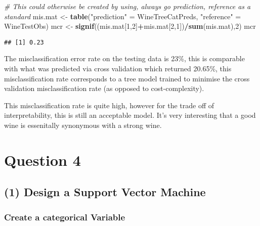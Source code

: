 \documentclass[12pt]{article}
\newenvironment{Shaded}{\begin{snugshade}}{\end{snugshade}}
\newcommand{\CommentTok}[1]{\textcolor[rgb]{0.56,0.35,0.01}{\textit{#1}}}
\newcommand{\DecValTok}[1]{\textcolor[rgb]{0.00,0.00,0.81}{#1}}
\newcommand{\KeywordTok}[1]{\textcolor[rgb]{0.13,0.29,0.53}{\textbf{#1}}}
\newcommand{\NormalTok}[1]{#1}
\newcommand{\OperatorTok}[1]{\textcolor[rgb]{0.81,0.36,0.00}{\textbf{#1}}}
\newcommand{\StringTok}[1]{\textcolor[rgb]{0.31,0.60,0.02}{#1}}
\begin{document}
\begin{Shaded}
\begin{Highlighting}[]
  \CommentTok{# This could otherwise be created by using, always go prediction, reference as a standard}
\NormalTok{  mis.mat <-}\StringTok{ }\KeywordTok{table}\NormalTok{(}\StringTok{"prediction"}\NormalTok{ =}\StringTok{ }\NormalTok{WineTreeCatPreds, }\StringTok{"reference"}\NormalTok{ =}\StringTok{ }\NormalTok{WineTestObs)}
\NormalTok{    mcr <-}\StringTok{ }\KeywordTok{signif}\NormalTok{((mis.mat[}\DecValTok{1}\NormalTok{,}\DecValTok{2}\NormalTok{]}\OperatorTok{+}\NormalTok{mis.mat[}\DecValTok{2}\NormalTok{,}\DecValTok{1}\NormalTok{])}\OperatorTok{/}\KeywordTok{sum}\NormalTok{(mis.mat),}\DecValTok{2}\NormalTok{)}
\NormalTok{    mcr}
\end{Highlighting}
\end{Shaded}

\begin{verbatim}
## [1] 0.23
\end{verbatim}

The misclassification error rate on the testing data is 23\%, this is
comparable with what was predicted via cross validation which returned
20.65\%, this misclassification rate corresponds to a tree model trained
to minimise the cross validation misclassification rate (as opposed to
cost-complexity).

This misclassification rate is quite high, however for the trade off of
interpretability, this is still an acceptable model. It's very
interesting that a good wine is essenitally synonymous with a strong
wine.

\hypertarget{question-4}{%
\section{Question 4}\label{question-4}}

\hypertarget{design-a-support-vector-machine}{%
\subsection{(1) Design a Support Vector
Machine}\label{design-a-support-vector-machine}}

\hypertarget{create-a-categorical-variable}{%
\subsubsection{Create a categorical
Variable}\label{create-a-categorical-variable}}
\end{document}
